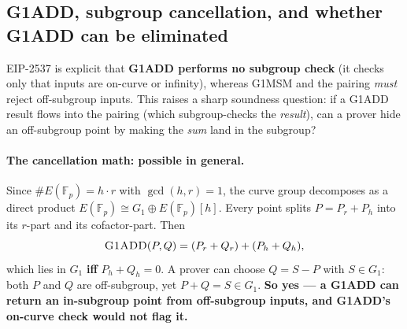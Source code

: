 \subsection{G1ADD, subgroup cancellation, and whether G1ADD can be eliminated}
\label{sec:pr-g1add-subgroup}

EIP-2537 is explicit that \textbf{G1ADD performs no subgroup check}
(it checks only that inputs are on-curve or infinity), whereas
G1MSM and the pairing \emph{must} reject off-subgroup inputs.
This raises a sharp soundness question: if a G1ADD result flows
into the pairing (which subgroup-checks the \emph{result}), can a
prover hide an off-subgroup point by making the \emph{sum} land in
the subgroup?

\paragraph{The cancellation math: possible in general.}
Since $\#E(\mathbb{F}_p) = h \cdot r$ with $\gcd(h,r)=1$, the
curve group decomposes as a direct product
$E(\mathbb{F}_p) \cong G_1 \oplus E(\mathbb{F}_p)[h]$. Every
point splits $P = P_r + P_h$ into its $r$-part and its
cofactor-part. Then
\begin{equation}
\textsc{G1ADD}(P,Q) = (P_r + Q_r) + (P_h + Q_h),
\end{equation}
which lies in $G_1$ \textbf{iff} $P_h + Q_h = 0$. A prover can
choose $Q = S - P$ with $S \in G_1$: both $P$ and $Q$ are
off-subgroup, yet $P + Q = S \in G_1$. \textbf{So yes --- a
G1ADD can return an in-subgroup point from off-subgroup inputs,
and G1ADD's on-curve check would not flag it.}

